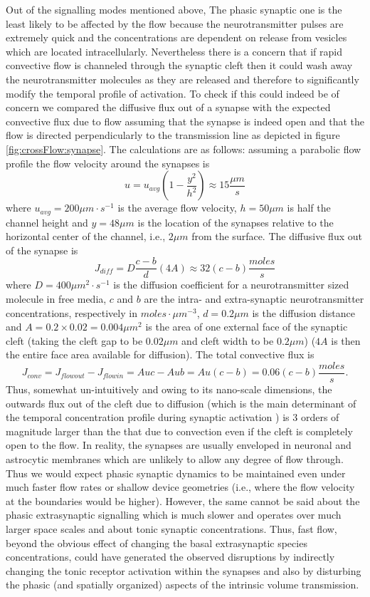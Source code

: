 Out of the signalling modes mentioned above, The phasic synaptic one is the least likely to be affected by the flow because the neurotransmitter pulses are extremely quick and the concentrations are dependent on release from vesicles which are located intracellularly. Nevertheless there is a concern that if rapid convective flow is channeled through the synaptic cleft then it could wash away the neurotransmitter molecules as they are released and therefore to significantly modify the temporal profile of activation. To check if this could indeed be of concern we compared the diffusive flux out of a synapse with the expected convective flux due to flow assuming that the synapse is indeed open and that the flow is directed perpendicularly to the transmission line as depicted in figure \ref{fig:crossFlow:synapse}. The calculations are as follows: assuming a parabolic flow profile the flow velocity around the synapses is \[u=u_{avg}(1-\frac{y^{2}}{h^{2}})\approx 15\frac{\mu m}{s}\] where \(u_{avg}=200 \mu m\cdot s^{-1}\) is the average flow velocity, \(h=50\mu m\) is half the channel height and \(y=48\mu m\) is the location of the synapses relative to the horizontal center of the channel, i.e., \(2\mu m\) from the surface. The diffusive flux out of the synapse is \[J_{diff}=D\frac{c-b}{d}(4A)\approx 32(c-b)\frac{moles}{s}\] where \(D=400 \mu m^{2}\cdot s^{-1}\) is the diffusion coefficient for a neurotransmitter sized molecule in free media, \(c\) and \(b\) are the intra- and extra-synaptic neurotransmitter concentrations, respectively in \(moles\cdot \mu m^{-3}\), \(d=0.2\mu m\) is the diffusion distance and \(A=0.2\times 0.02=0.004\mu m^{2}\) is the area of one external face of the synaptic cleft (taking the cleft gap to be \(0.02\mu m\) and cleft width to be \(0.2\mu m\)) (\(4A\) is then the entire face area available for diffusion). The total convective flux is \[J_{conv}=J_{flowout}-J_{flowin}=Auc-Aub=Au(c-b)=0.06(c-b)\frac{moles}{s}.\] Thus, somewhat un-intuitively and owing to its nano-scale dimensions, the outwards flux out of the cleft due to diffusion (which is the main determinant of the temporal concentration profile during synaptic activation \cite{clements1996transmitter}) is 3 orders of magnitude larger than the that due to convection even if the cleft is completely open to the flow. In reality, the synapses are usually enveloped in neuronal and astrocytic membranes which are unlikely to allow any degree of flow through. Thus we would expect phasic synaptic dynamics to be maintained even under much faster flow rates or shallow device geometries (i.e., where the flow velocity at the boundaries would be higher). However, the same cannot be said about the phasic extrasynaptic signalling which is much slower and operates over much larger space scales and about tonic synaptic concentrations. Thus, fast flow, beyond the obvious effect of changing the basal extrasynaptic species concentrations, could have generated the observed disruptions by indirectly changing the tonic receptor activation within the synapses and also by disturbing the phasic (and spatially organized) aspects of the intrinsic volume transmission.





